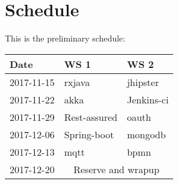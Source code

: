 \section*{Schedule}

This is the preliminary schedule:

\begin{center}
  \begin{tabular}{|l|l|l|}\hline
    \textbf{Date}& \textbf{WS 1}& \textbf{WS 2}\\\hline
    2017-11-15 & rxjava & jhipster\\\hline
    2017-11-22 & akka & Jenkins-ci\\\hline
    2017-11-29 & Rest-assured & oauth\\\hline
    2017-12-06 & Spring-boot & mongodb\\\hline
    2017-12-13 & mqtt & bpmn\\\hline
    2017-12-20 & \multicolumn{2}{c|}{Reserve and wrapup}\\\hline
  \end{tabular}
\end{center}

